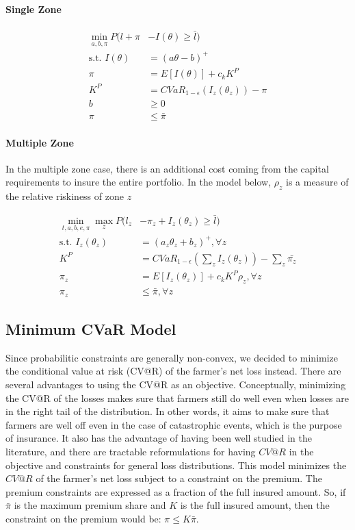 \documentclass[11pt]{article}
\begin{document}
    \paragraph*{Single Zone}
    
    \begin{align}
        \min_{a,b,\pi} P(l + \pi &-I(\theta) \geq \bar{l})\\
        \text{s.t.   } I(\theta) &= (a\theta - b)^+\\
        \pi &= E[I(\theta)] + c_k K^P\\
        K^P &= CVaR_{1-\epsilon}\left ( I_z(\theta_z) \right ) - \pi\\
        b &\geq 0\\
        \pi &\leq \bar{\pi}
    \end{align}
    
    \paragraph*{Multiple Zone}
    In the multiple zone case, there is an additional cost coming from the capital requirements to insure the entire portfolio. In the model below, $\rho_z$ is a measure of the relative riskiness of zone $z$
    
    \begin{align}
        \min_{t,a,b,e,\pi} \max_z P(l_z &- \pi_z +I_z(\theta_z) \geq \bar{l})\\
        \text{s.t.   } I_z(\theta_z) &= (a_z\theta_z + b_z)^+, \forall z\\
        K^P &= CVaR_{1-\epsilon}\left (\sum_z I_z(\theta_z) \right ) - \sum_z \bar{\pi_z}\\
        \pi_z &= E[I_z(\theta_z)]+c_k K^P \rho_z, \forall z \\
        \pi_z &\leq \bar{\pi}, \forall z
    \end{align}

  \subsection{Minimum CVaR Model}
  Since probabilitic constraints are generally non-convex, we decided to minimize the conditional value at risk (CV@R) of the farmer's net loss instead. There are several advantages to using the CV@R as an objective. Conceptually, minimizing the CV@R of the losses makes sure that farmers still do well even when losses are in the right tail of the distribution. In other words, it aims to make sure that farmers are well off even in the case of catastrophic events, which is the purpose of insurance. It also has the advantage of having been well studied in the literature, and there are tractable reformulations for having $CV@R$ in the objective and constraints for general loss distributions. This model minimizes the $CV@R$ of the farmer's net loss subject to a constraint on the premium. The premium constraints are expressed as a fraction of the full insured amount. So, if $\bar{\pi}$ is the maximum premium share and $K$ is the full insured amount, then the constraint on the premium would be: $\pi \leq K \bar{\pi}$.
  
\end{document}
